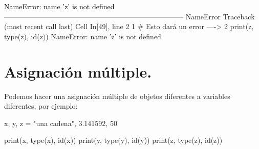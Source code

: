 \documentclass[
  spanish,
  letterpaper,
]{scrbook}
\newenvironment{Shaded}{\begin{snugshade}}{\end{snugshade}}
\newcommand{\BuiltInTok}[1]{\textcolor[rgb]{0.00,0.23,0.31}{#1}}
\newcommand{\DecValTok}[1]{\textcolor[rgb]{0.68,0.00,0.00}{#1}}
\newcommand{\FloatTok}[1]{\textcolor[rgb]{0.68,0.00,0.00}{#1}}
\newcommand{\NormalTok}[1]{\textcolor[rgb]{0.00,0.23,0.31}{#1}}
\newcommand{\OperatorTok}[1]{\textcolor[rgb]{0.37,0.37,0.37}{#1}}
\newcommand{\StringTok}[1]{\textcolor[rgb]{0.13,0.47,0.30}{#1}}
\theoremstyle{definition}
\theoremstyle{remark}
\begin{document}
\begin{Highlighting}
\textcolor{black}{NameError: name 'z' is not defined}
\textcolor{black}{}\textcolor{QuartoInternalColor1}{---------------------------------------------------------------------------}\textcolor{QuartoInternalColor2}{}
\textcolor{QuartoInternalColor2}{}\textcolor{QuartoInternalColor1}{NameError}\textcolor{QuartoInternalColor2}{                                 Traceback (most recent call last)}
\textcolor{QuartoInternalColor2}{}\textcolor{QuartoInternalColor3}{Cell}\textcolor{QuartoInternalColor2}{}\textcolor{QuartoInternalColor3}{ }\textcolor{QuartoInternalColor2}{}\textcolor{QuartoInternalColor4}{In[49]}\textcolor{QuartoInternalColor2}{}\textcolor{QuartoInternalColor4}{, line 2}\textcolor{QuartoInternalColor2}{}
\textcolor{QuartoInternalColor2}{}\textcolor{QuartoInternalColor4}{      1}\textcolor{QuartoInternalColor2}{ }\textcolor{QuartoInternalColor9}{# Esto dará un error}\textcolor{QuartoInternalColor2}{}
\textcolor{QuartoInternalColor2}{}\textcolor{QuartoInternalColor4}{----> }\textcolor{QuartoInternalColor2}{}\textcolor{QuartoInternalColor4}{2}\textcolor{QuartoInternalColor2}{ }\textcolor{QuartoInternalColor5}{print}\textcolor{QuartoInternalColor2}{(}\textcolor{QuartoInternalColor2}{z}\textcolor{QuartoInternalColor2}{, }\textcolor{QuartoInternalColor5}{type}\textcolor{QuartoInternalColor2}{(z), }\textcolor{QuartoInternalColor5}{id}\textcolor{QuartoInternalColor2}{(z))}
\textcolor{QuartoInternalColor2}{}\textcolor{QuartoInternalColor1}{NameError}\textcolor{QuartoInternalColor2}{: name 'z' is not defined}
\end{Highlighting}

\section{Asignación múltiple.}\label{sec-a-asignacion-multiple}

Podemos hacer una asignación múltiple de objetos diferentes a variables
diferentes, por ejemplo:

\begin{Shaded}
\begin{Highlighting}[]
\NormalTok{x, y, z }\OperatorTok{=} \StringTok{"una cadena"}\NormalTok{, }\FloatTok{3.141592}\NormalTok{, }\DecValTok{50}

\BuiltInTok{print}\NormalTok{(x, }\BuiltInTok{type}\NormalTok{(x), }\BuiltInTok{id}\NormalTok{(x))}
\BuiltInTok{print}\NormalTok{(y, }\BuiltInTok{type}\NormalTok{(y), }\BuiltInTok{id}\NormalTok{(y))}
\BuiltInTok{print}\NormalTok{(z, }\BuiltInTok{type}\NormalTok{(z), }\BuiltInTok{id}\NormalTok{(z))}
\end{Highlighting}
\end{Shaded}
\end{document}
